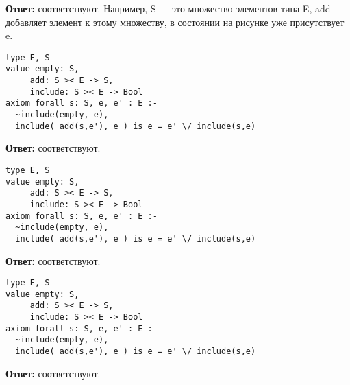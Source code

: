 \MediumPicture{}

\textbf{Ответ:} соответствуют. Например, S --- это множество элементов типа E, add добавляет элемент к этому множеству, в состоянии на рисунке уже присутствует e.

\z \begin{lstlisting}
type E, S
value empty: S,
     add: S >< E -> S,
     include: S >< E -> Bool
axiom forall s: S, e, e' : E :-
  ~include(empty, e),
  include( add(s,e'), e ) is e = e' \/ include(s,e)
\end{lstlisting}

\MediumPicture{}

\textbf{Ответ:} соответствуют.


\z \begin{lstlisting}
type E, S
value empty: S,
     add: S >< E -> S,
     include: S >< E -> Bool
axiom forall s: S, e, e' : E :-
  ~include(empty, e),
  include( add(s,e'), e ) is e = e' \/ include(s,e)
\end{lstlisting}

\MediumPicture{}

\textbf{Ответ:} соответствуют.


\z \begin{lstlisting}
type E, S
value empty: S,
     add: S >< E -> S,
     include: S >< E -> Bool
axiom forall s: S, e, e' : E :-
  ~include(empty, e),
  include( add(s,e'), e ) is e = e' \/ include(s,e)
\end{lstlisting}

\MediumPicture{}

\textbf{Ответ:} соответствуют.


